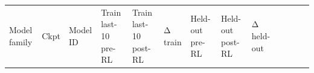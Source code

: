 \documentclass[
  american,
  11pt,
  a4paper,
  oneside]{report}
\newcounter{none} %
\begin{document}
{\def\LTcaptype{none} %
\begin{longtable}[]{@{}
  >{\raggedright\arraybackslash}p{}
  >{\raggedright\arraybackslash}p{}
  >{\raggedright\arraybackslash}p{}
  >{\raggedright\arraybackslash}p{}
  >{\raggedright\arraybackslash}p{}
  >{\raggedright\arraybackslash}p{}
  >{\raggedright\arraybackslash}p{}
  >{\raggedright\arraybackslash}p{}
  >{\raggedright\arraybackslash}p{}
  >{\raggedright\arraybackslash}p{}
  >{\raggedright\arraybackslash}p{}
  >{\raggedright\arraybackslash}p{}
  >{\raggedright\arraybackslash}p{}@{}}
\toprule\noalign{}
\begin{minipage}[b]{\linewidth}\raggedright
Model family
\end{minipage} & \begin{minipage}[b]{\linewidth}\raggedright
Ckpt
\end{minipage} & \begin{minipage}[b]{\linewidth}\raggedright
Model ID
\end{minipage} & \begin{minipage}[b]{\linewidth}\raggedright
Train last-10 pre-RL
\end{minipage} & \begin{minipage}[b]{\linewidth}\raggedright
Train last-10 post-RL
\end{minipage} & \begin{minipage}[b]{\linewidth}\raggedright
Δ train
\end{minipage} & \begin{minipage}[b]{\linewidth}\raggedright
Held-out pre-RL
\end{minipage} & \begin{minipage}[b]{\linewidth}\raggedright
Held-out post-RL
\end{minipage} & \begin{minipage}[b]{\linewidth}\raggedright
Δ held-out
\end{minipage} & \begin{minipage}[b]{\linewidth}\raggedright

\end{minipage}
\end{longtable}}
\end{document}
